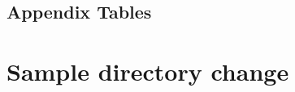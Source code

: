 \documentclass[utf8]{article}
\begin{document}
\subsection{Appendix Tables}
\label{sec:app:tables}











%
%
%
%
%
%

%

\section{Sample directory change}
\label{app:directorychg}
\end{document}
